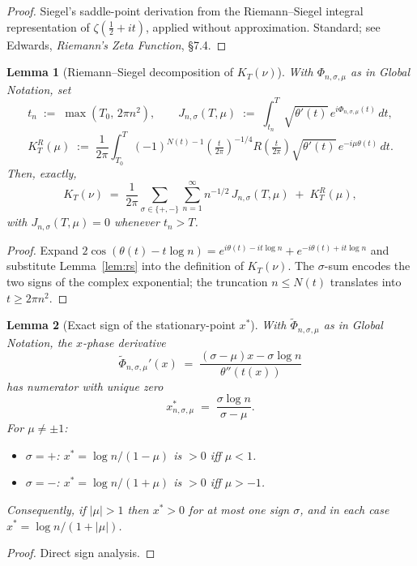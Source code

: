 \documentclass[11pt]{article}
\newtheorem{lemma}{Lemma}
\begin{document}
\begin{proof}
Siegel's saddle-point derivation from the Riemann--Siegel integral representation of $\zeta(\tfrac12+it)$, applied without approximation. Standard; see Edwards, \emph{Riemann's Zeta Function}, \S7.4.
\end{proof}

\begin{lemma}[Riemann--Siegel decomposition of $K_{T}(\nu)$]\label{lem:decomp}
With $\Phi_{n,\sigma,\mu}$ as in Global Notation, set
\[
t_{n} \;:=\; \max(T_{0},\,2\pi n^{2}),\qquad
J_{n,\sigma}(T,\mu) \;:=\; \int_{t_{n}}^{T}\sqrt{\theta'(t)}\, e^{i\Phi_{n,\sigma,\mu}(t)}\,dt,
\]
\[
K_{T}^{R}(\mu) \;:=\; \frac{1}{2\pi}\int_{T_{0}}^{T}(-1)^{N(t)-1}\!\left(\tfrac{t}{2\pi}\right)^{-1/4}\!R\!\left(\tfrac{t}{2\pi}\right)\sqrt{\theta'(t)}\, e^{-i\mu\theta(t)}\,dt.
\]
Then, exactly,
\[
K_{T}(\nu) \;=\; \frac{1}{2\pi}\sum_{\sigma\in\{+,-\}}\sum_{n=1}^{\infty} n^{-1/2}\,J_{n,\sigma}(T,\mu) \;+\; K_{T}^{R}(\mu),
\]
with $J_{n,\sigma}(T,\mu)=0$ whenever $t_{n}>T$.
\end{lemma}

\begin{proof}
Expand $2\cos(\theta(t)-t\log n) = e^{i\theta(t)-it\log n}+e^{-i\theta(t)+it\log n}$ and substitute Lemma~\ref{lem:rs} into the definition of $K_{T}(\nu)$. The $\sigma$-sum encodes the two signs of the complex exponential; the truncation $n\le N(t)$ translates into $t\ge 2\pi n^{2}$.
\end{proof}

\begin{lemma}[Exact sign of the stationary-point $x^{*}$]\label{lem:xsign}
With $\widetilde\Phi_{n,\sigma,\mu}$ as in Global Notation, the $x$-phase derivative
\[
\widetilde\Phi_{n,\sigma,\mu}'(x) \;=\; \frac{(\sigma-\mu)x - \sigma\log n}{\theta''(t(x))}
\]
has numerator with unique zero
\[
x^{*}_{n,\sigma,\mu} \;=\; \frac{\sigma\log n}{\sigma-\mu}.
\]
For $\mu\ne\pm 1$:
\begin{itemize}
\item $\sigma=+$: $x^{*} = \log n/(1-\mu)$ is $>0$ iff $\mu<1$.
\item $\sigma=-$: $x^{*} = \log n/(1+\mu)$ is $>0$ iff $\mu>-1$.
\end{itemize}
Consequently, if $|\mu|>1$ then $x^{*}>0$ for at most one sign $\sigma$, and in each case $x^{*} = \log n/(1+|\mu|)$.
\end{lemma}

\begin{proof}
Direct sign analysis.
\end{proof}
\end{document}
